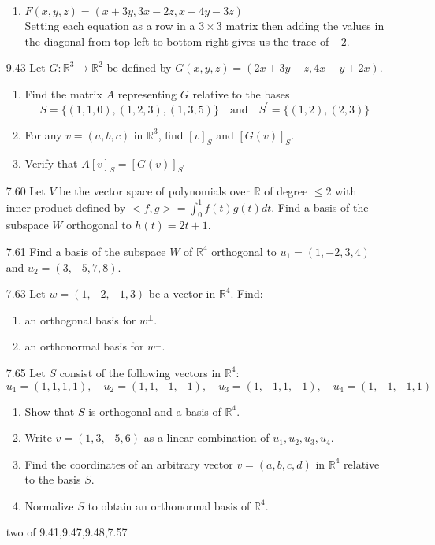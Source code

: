 \documentclass[12pt]{article}
\theoremstyle{definition}
\theoremstyle{plain}
\begin{document}
\begin{enumerate}
\begin{enumerate}
	\item $F(x,y,z)=(x+3y,3x-2z,x-4y-3z)$\\
		Setting each equation as a row in a $3\times 3$ matrix then adding the values in the diagonal from top left to bottom right gives us the trace of $-2$.
	\end{enumerate}
\item[9.43]Let $G:\mathbb{R}^3\rightarrow\mathbb{R}^2$ be defined by $G(x,y,z)=(2x+3y-z,4x-y+2x)$.
	\begin{enumerate}
	\item Find the matrix $A$ representing $G$ relative to the bases
	\[ S=\{(1,1,0),(1,2,3),(1,3,5)\} \quad \mathrm{and} \quad S^\prime = \{(1,2),(2,3)\} \]
	\item For any $v=(a,b,c)$ in $\mathbb{R}^3$, find $[v]_S$ and $[G(v)]_S$.
	\item Verify that $A[v]_S=[G(v)]_{S^\prime}$
	\end{enumerate}
\item[7.60]Let $V$ be the vector space of polynomials over $\mathbb{R}$ of degree $\leq 2$ with inner product defined by $<f,g>=\int_0^1f(t)g(t)dt$. Find a basis of the subspace $W$ orthogonal to $h(t)=2t+1$.
\item[7.61]Find a basis of the subspace $W$ of $\mathbb{R}^4$ orthogonal to $u_1=(1,-2,3,4)$ and $u_2=(3,-5,7,8)$.
\item[7.63]Let $w=(1,-2,-1,3)$ be a vector in $\mathbb{R}^4$. Find:
	\begin{enumerate}
	\item an orthogonal basis for $w^\perp$.
	\item an orthonormal basis for $w^\perp$.
	\end{enumerate}
\item[7.65]Let $S$ consist of the following vectors in $\mathbb{R}^4$:
\[ u_1=(1,1,1,1), \quad u_2=(1,1,-1,-1), \quad u_3=(1,-1,1,-1), \quad u_4=(1,-1,-1,1) \]
	\begin{enumerate}
	\item Show that $S$ is orthogonal and a basis of $\mathbb{R}^4$.
	\item Write $v=(1,3,-5,6)$ as a linear combination of $u_1,u_2,u_3,u_4$.
	\item Find the coordinates of an arbitrary vector $v=(a,b,c,d)$ in $\mathbb{R}^4$ relative to the basis $S$.
	\item Normalize $S$ to obtain an orthonormal basis of $\mathbb{R}^4$.
	\end{enumerate}


two of 9.41,9.47,9.48,7.57






\end{enumerate}
\end{document}
